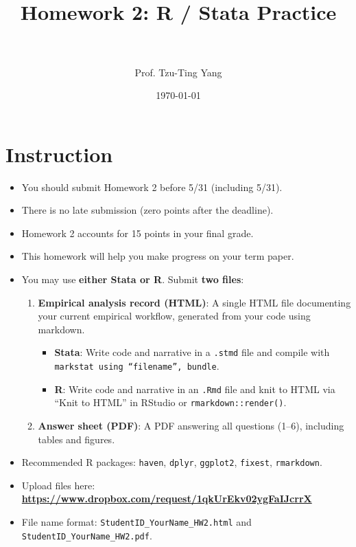 \documentclass[paper=a4, fontsize=11pt]{scrartcl}
\title{
\normalfont \normalsize
\horrule{0.5pt} \\[0.4cm]
\huge Homework 2: R / Stata Practice \\
\horrule{2pt} \\[0.5cm]
}
\author{Prof. Tzu-Ting Yang}
\date{\normalsize\today}
\begin{document}
\maketitle




\section*{Instruction}

\begin{itemize}
\item[\textbullet] You should submit Homework 2 before 5/31 (including 5/31).
\item[\textbullet] There is no late submission (zero points after the deadline).
\item[\textbullet] Homework 2 accounts for 15 points in your final grade.
\item[\textbullet] This homework will help you make progress on your term paper.
\item[\textbullet] You may use \textbf{either Stata or R}. Submit \textbf{two files}:
  \begin{enumerate}
    \item \textbf{Empirical analysis record (HTML)}: A single HTML file documenting your current empirical workflow, generated from your code using markdown.
    \begin{itemize}
      \item \textbf{Stata}: Write code and narrative in a \texttt{.stmd} file and compile with \texttt{markstat using ``filename'', bundle}.
      \item \textbf{R}: Write code and narrative in an \texttt{.Rmd} file and knit to HTML via ``Knit to HTML'' in RStudio or \texttt{rmarkdown::render()}.
    \end{itemize}
    \item \textbf{Answer sheet (PDF)}: A PDF answering all questions (1--6), including tables and figures.
  \end{enumerate}
\item[\textbullet] Recommended R packages: \texttt{haven}, \texttt{dplyr}, \texttt{ggplot2}, \texttt{fixest}, \texttt{rmarkdown}.
\item[\textbullet] Upload files here: \textbf{\url{https://www.dropbox.com/request/1qkUrEkv02ygFaIJcrrX}}
\item[\textbullet] File name format: \texttt{StudentID\_YourName\_HW2.html} and \texttt{StudentID\_YourName\_HW2.pdf}.
\end{itemize}
\end{document}
